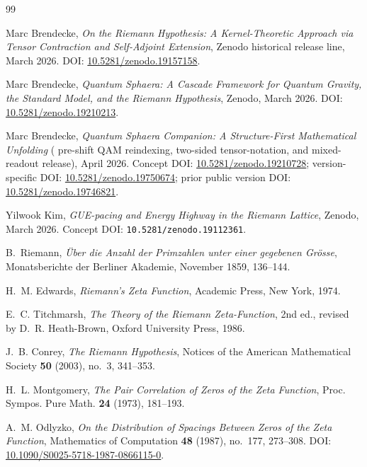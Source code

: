 \begin{thebibliography}{99}

Marc Brendecke,
\emph{On the Riemann Hypothesis: A Kernel-Theoretic Approach via Tensor Contraction and Self-Adjoint Extension},
Zenodo historical release line, March 2026.
\newblock DOI: \href{https://doi.org/10.5281/zenodo.19157158}{10.5281/zenodo.19157158}.

Marc Brendecke,
\emph{Quantum Sphaera: A Cascade Framework for Quantum Gravity, the Standard Model, and the Riemann Hypothesis},
Zenodo, March 2026.
\newblock DOI: \href{https://doi.org/10.5281/zenodo.19210213}{10.5281/zenodo.19210213}.

Marc Brendecke,
\emph{Quantum Sphaera Companion: A Structure-First Mathematical Unfolding} ( pre-shift QAM reindexing, two-sided tensor-notation, and mixed-readout release),
April 2026.
\newblock Concept DOI: \href{https://doi.org/10.5281/zenodo.19210728}{10.5281/zenodo.19210728}; version-specific DOI: \href{https://doi.org/10.5281/zenodo.19750674}{10.5281/zenodo.19750674}; prior public version DOI: \href{https://doi.org/10.5281/zenodo.19746821}{10.5281/zenodo.19746821}.

Yilwook Kim,
\emph{GUE-pacing and Energy Highway in the Riemann Lattice},
Zenodo, March 2026.
\newblock Concept DOI: \texttt{10.5281/zenodo.19112361}.

B.~Riemann,
\emph{\"Uber die Anzahl der Primzahlen unter einer gegebenen Gr\"osse},
Monatsberichte der Berliner Akademie, November 1859, 136--144.

H.~M. Edwards,
\emph{Riemann's Zeta Function},
Academic Press, New York, 1974.

E.~C. Titchmarsh,
\emph{The Theory of the Riemann Zeta-Function},
2nd ed., revised by D.~R. Heath-Brown,
Oxford University Press, 1986.

J.~B. Conrey,
\emph{The Riemann Hypothesis},
Notices of the American Mathematical Society \textbf{50} (2003), no.~3, 341--353.

H.~L. Montgomery,
\emph{The Pair Correlation of Zeros of the Zeta Function},
Proc. Sympos. Pure Math. \textbf{24} (1973), 181--193.

A.~M. Odlyzko,
\emph{On the Distribution of Spacings Between Zeros of the Zeta Function},
Mathematics of Computation \textbf{48} (1987), no.~177, 273--308.
\newblock DOI: \href{https://doi.org/10.1090/S0025-5718-1987-0866115-0}{10.1090/S0025-5718-1987-0866115-0}.


\end{thebibliography}
